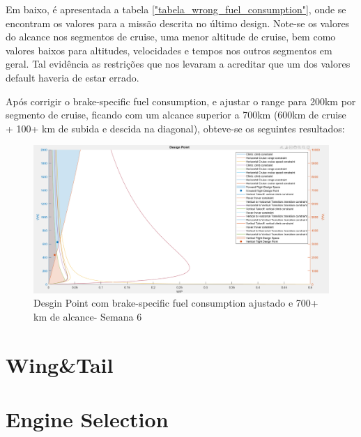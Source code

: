 Em baixo, é apresentada a tabela \ref{"tabela_wrong_fuel_consumption"}, onde se encontram os valores para a missão descrita no último design. Note-se os valores do alcance nos segmentos de cruise, uma menor altitude de cruise, bem como valores baixos para altitudes, velocidades e tempos nos outros segmentos em geral. Tal evidência as restrições que nos levaram a acreditar que um dos valores default haveria de estar errado.\par

Após corrigir o brake-specific fuel consumption, e ajustar o range para 200km por segmento de cruise, ficando com um alcance superior a 700km (600km de cruise + 100+ km de subida e descida na diagonal), obteve-se os seguintes resultados:
\FloatBarrier
\begin{figure}[h]
    \centering
    \includegraphics[width=\textwidth]{Imagens/semana6_com_brake_specific_correto_designpoint.PNG}
    \caption{Desgin Point com brake-specific fuel consumption ajustado e 700+ km de alcance- Semana 6}
    \label{designpoint_plot_semana6_correto_specifc_fuel consumption}
\end{figure}
\FloatBarrier

\section{Wing\&Tail}
\section{Engine Selection}